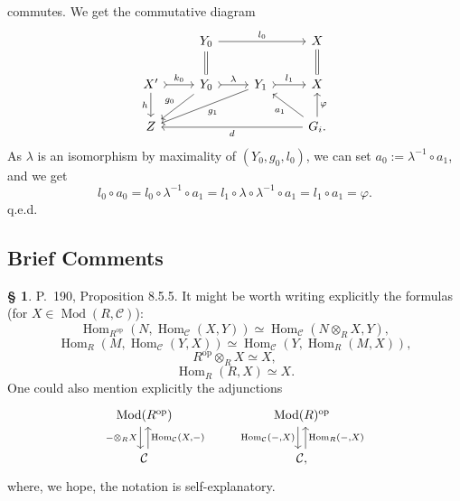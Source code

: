 \documentclass[12pt]{article}%
\theoremstyle{remark}
\theoremstyle{definition}
\newtheorem{s}[thm]{\S}%
\newcommand{\C}{\mathcal C}
\newcommand{\pp}{\varphi}
\DeclareMathOperator{\Hom}{Hom}%
\DeclareMathOperator{\Mod}{Mod}
\DeclareMathOperator{\op}{op}
\begin{document}
commutes. We get the commutative diagram
$$
\begin{tikzcd}
{}&Y_0\ar[equal]{d}\ar{rr}{l_0}&&X\ar[equal]{d}\\ 
X'\ar{d}[swap]{h}\ar[tail]{r}{k_0}&Y_0\ar{dl}[swap]{g_0}\ar[tail]{r}{\lambda}&Y_1\ar{dll}{g_1}\ar[tail]{r}{l_1}&X\\ 
Z&&&G_i.\ar{u}[swap]{\pp}\ar{lll}{d}\ar{ul}{a_1}
\end{tikzcd}
$$ 
As $\lambda$ is an isomorphism by maximality of $(Y_0,g_0,l_0)$, we can set $a_0:=\lambda^{-1}\circ a_1$, and we get 
$$
l_0\circ a_0=l_0\circ\lambda^{-1}\circ a_1=l_1\circ\lambda\circ\lambda^{-1}\circ a_1=l_1\circ a_1=\pp.
$$ 
q.e.d.

%

\begin{comment}
Then the diagram 
$$
\begin{tikzcd}
0\ar{r}&Y\ar[equal]{d}\ar{r}{(b,-c)}&Y_0\oplus G_i\ar[equal]{d}\ar{r}{(l_0,\pp)}&X\\
&Y\ar{r}[swap]{(b,-c)}&Y_0\oplus G_i\ar{r}[swap]{(\lambda,a_1)}&Y_1\ar{r}\ar{u}[swap]{l_1}&0
\end{tikzcd}
$$ 
commutes and has exact rows. By the Five Lemma, $l_1$ is a monomorphism. As $l_1\circ\lambda=l_0$ is a monomorphism, so is $\lambda$. Lemma 8.3.11 (a) (i) p.~180 of the book (stated as Lemma~\ref{8311} p.~\pageref{8311}) implies that $c$ is also a monomorphism.
\end{comment}


\subsection{Brief Comments}

\begin{s} P.~190, Proposition 8.5.5. It might be worth writing explicitly the formulas (for $X\in\Mod(R,\C)$):
$$
\Hom_{R^{\op}}(N,\Hom_\C(X,Y))\simeq
\Hom_\C\left(N\otimes_RX,Y\right),
$$
$$
\Hom_R(M,\Hom_\C(Y,X))\simeq
\Hom_\C\left(Y,\Hom_R(M,X)\right),
$$
$$
R^{\op}\otimes_RX\simeq X,
$$
$$
\Hom_R(R,X)\simeq X.
$$
One could also mention explicitly the adjunctions
$$
\begin{tikzcd}
\Mod(R^{\op})\ar[xshift=-0.7ex]{d}[swap]{-\otimes_RX}&&&
\Mod(R)^{\op}\ar[xshift=-0.7ex]{d}[swap]{\Hom_\C(-,X)}\\
\C\ar[xshift=0.7ex]{u}[swap]{\Hom_\C(X,-)}&&&\C,\ar[xshift=0.7ex]{u}[swap]{\Hom_R(-,X)}
\end{tikzcd}
$$
where, we hope, the notation is self-explanatory.
\end{s}
\end{document}
